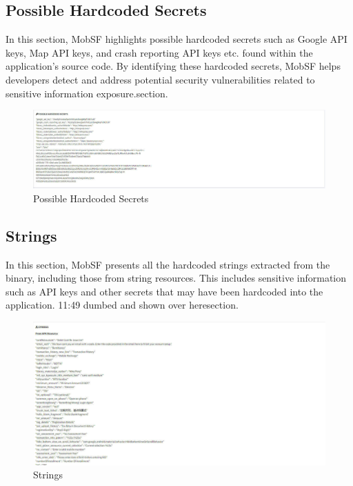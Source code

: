 \documentclass{report}
\begin{document}
\subsection{Possible Hardcoded Secrets}
In this section, MobSF highlights possible hardcoded secrets such as Google API keys, Map API keys, and crash reporting API keys etc. found within the application's source code. By identifying these hardcoded secrets, MobSF helps developers detect and address potential security vulnerabilities related to sensitive information exposure.section.
\begin{figure}[hbt!]
    \centering
    \includegraphics[width=1\linewidth]{images/psbl_secrets.jpg}
    \caption{Possible Hardcoded Secrets}
    \label{fig:example}
\end{figure}
\FloatBarrier

\subsection{Strings}
In this section, MobSF presents all the hardcoded strings extracted from the binary, including those from string resources. This includes sensitive information such as API keys and other secrets that may have been hardcoded into the application.
11:49
dumbed and shown over heresection.
\begin{figure}[hbt!]
    \centering
    \includegraphics[width=1\linewidth]{images/strings.jpg}
    \caption{Strings}
    \label{fig:example}
\end{figure}
\FloatBarrier
\end{document}
